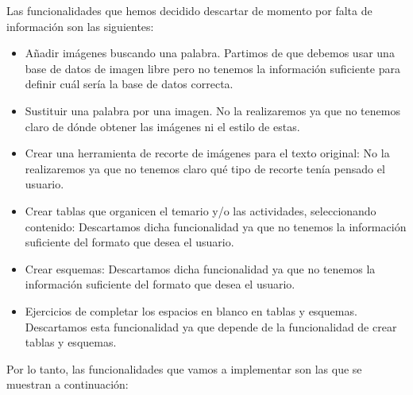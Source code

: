 Las funcionalidades que hemos decidido descartar de momento por falta de información son las siguientes:
\begin{itemize}
  \item Añadir imágenes buscando una palabra. Partimos de que debemos usar una base de datos de imagen libre pero no tenemos la información suficiente para definir cuál sería la base de datos correcta.
  \item Sustituir una palabra por una imagen. No la realizaremos ya que no tenemos claro de dónde obtener las imágenes ni el estilo de estas.
  \item Crear una herramienta de recorte de imágenes para el texto original: No la realizaremos ya que no tenemos claro qué tipo de recorte tenía pensado el usuario.
  \item Crear tablas que organicen el temario y/o las actividades, seleccionando contenido: Descartamos dicha funcionalidad ya que no tenemos la información suficiente del formato que desea el usuario.
  \item Crear esquemas: Descartamos dicha funcionalidad ya que no tenemos la información suficiente del formato que desea el usuario.
  \item Ejercicios de completar los espacios en blanco en tablas y esquemas. Descartamos esta funcionalidad ya que depende de la funcionalidad de crear tablas y esquemas.
\end{itemize}

Por lo tanto, las funcionalidades que vamos a implementar son las que se muestran a continuación:

